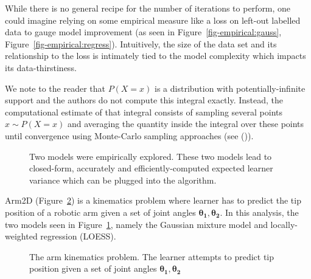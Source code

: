 \documentclass[
  letterpaper,
  numbers=noenddot,
  DIV=11]{scrreprt}
\theoremstyle{definition}
\theoremstyle{plain}
\theoremstyle{plain}
\theoremstyle{remark}
\begin{document}
While there is no general recipe for the number of iterations to
perform, one could imagine relying on some empirical measure like a loss
on left-out labelled data to gauge model improvement (as seen in
Figure~\ref{fig-empirical:gauss}, Figure~\ref{fig-empirical:regress}).
Intuitively, the size of the data set and its relationship to the loss
is intimately tied to the model complexity which impacts its
data-thirstiness.

We note to the reader that \(P(X=x)\) is a distribution with
potentially-infinite support and the authors do not compute this
integral exactly. Instead, the computational estimate of that integral
consists of sampling several points \(x \sim P(X=x)\) and averaging the
quantity inside the integral over these points until convergence using
Monte-Carlo sampling approaches (see ()).

\begin{figure}


\caption{\label{fig-two_models}Two models were empirically explored.
These two models lead to closed-form, accurately and
efficiently-computed expected learner variance which can be plugged into
the algorithm.}

\end{figure}%

Arm2D (Figure~\ref{fig-arm2D}) is a kinematics problem where learner has
to predict the tip position of a robotic arm given a set of joint angles
\(\mathbf{\theta_1}, \mathbf{\theta_2}\). In this analysis, the two
models seen in Figure~\ref{fig-two_models}, namely the Gaussian mixture
model and locally-weighted regression (LOESS).

\begin{figure}


\caption{\label{fig-arm2D}The arm kinematics problem. The learner
attempts to predict tip position given a set of joint angles
\(\mathbf{\theta_1}, \mathbf{\theta_2}\)}

\end{figure}%
\end{document}
